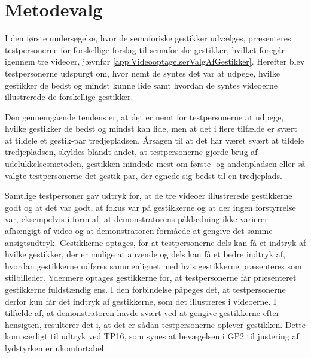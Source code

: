 \section{Metodevalg}
\label{DiskussionMetodevalg}
%
I den første undersøgelse, hvor de semaforiske gestikker udvælges, præsenteres testpersonerne for forskellige forslag til semaforiske gestikker, hvilket foregår igennem tre videoer, jævnfør \autoref{app:VideooptagelserValgAfGestikker}. Herefter blev testpersonerne udspurgt om, hvor nemt de syntes det var at udpege, hvilke gestikker de bedst og mindst kunne lide samt hvordan de syntes videoerne illustrerede de forskellige gestikker.

Den gennemgående tendens er, at det er nemt for testpersonerne at udpege, hvilke gestikker de bedst og mindst kan lide, men at det i flere tilfælde er svært at tildele et gestik-par tredjepladsen. Årsagen til at det har været svært at tildele tredjepladsen, skyldes blandt andet, at testpersonerne gjorde brug af udelukkelsesmetoden, gestikken mindede mest om første- og andenpladsen eller så valgte testpersonerne det gestik-par, der egnede sig bedst til en tredjeplads. 

Samtlige testpersoner gav udtryk for, at de tre videoer illustrerede gestikkerne godt og at det var godt, at fokus var på gestikkerne og at der ingen forstyrrelse var, eksempelvis i form af, at demonstratorens påklædning ikke varierer afhængigt af video og at demonstratoren formåede at gengive det samme ansigtsudtryk. Gestikkerne optages, for at testpersonerne dels kan få et indtryk af hvilke gestikker, der er mulige at anvende og dels kan få et bedre indtryk af, hvordan gestikkerne udføres sammenlignet med hvis gestikkerne præsenteres som stilbilleder. Ydermere optages gestikkerne for, at testpersonerne får præsenteret gestikkerne fuldstændig ens. I den forbindelse påpeges det, at testpersonerne derfor kun får det indtryk af gestikkerne, som det illustreres i videoerne. I tilfælde af, at demonstratoren havde svært ved at gengive gestikkerne efter hensigten, resulterer det i, at det er sådan testpersonerne oplever gestikken. Dette kom særligt til udtryk ved TP16, som synes at bevægelsen i GP2 til justering af lydstyrken er ukomfortabel. 

